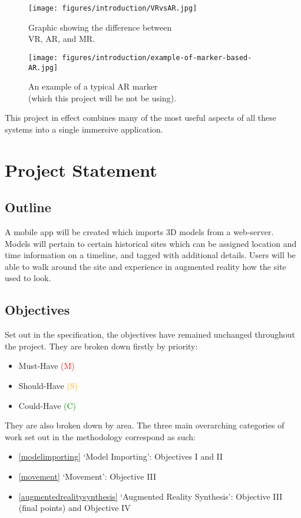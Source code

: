 \documentclass[12pt, a4paper]{article}
\newcommand{\must}[1]{\textcolor{red}{#1}}
\newcommand{\should}[1]{\textcolor{orange}{#1}}
\newcommand{\could}[1]{\textcolor{green}{#1}}
\begin{document}
\begin{figure}[H]
\centering
\begin{minipage}{.5\textwidth}
  \centering
  \texttt{[image: figures/introduction/VRvsAR.jpg]}
  \caption{Graphic showing the difference between \\ VR, AR, and MR. \cite{originality:arvrmr}}
  \label{fig:VRvsAR}
\end{minipage}%
\begin{minipage}{.5\textwidth}
  \centering
  \texttt{[image: figures/introduction/example-of-marker-based-AR.jpg]}
  \caption{An example of a typical AR marker \\ (which this project will be not be using). \cite{originality:armarker}}
  \label{fig:ARmarker}
\end{minipage}
\end{figure}

This project in effect combines many of the most useful aspects of all these systems into a single immersive application.

\newpage
\section{Project Statement}
\subsection{Outline}
A mobile app will be created which imports 3D models from a web-server. Models will pertain to certain historical sites which can be assigned location and time information on a timeline, and tagged with additional details. Users will be able to walk around the site and experience in augmented reality how the site used to look.

\subsection{Objectives}
\label{Objectives}
Set out in the specification, the objectives have remained unchanged throughout the project. They are broken down firstly by priority: 
\begin{itemize}
    \item Must-Have \must{(M)}
    \item Should-Have \should{(S)}
    \item Could-Have \could{(C)}
\end{itemize}

They are also broken down by area. The three main overarching categories of work set out in the methodology correspond as such:
\begin{itemize}
    \item \ref{modelimporting} `Model Importing': Objectives I and II 
    \item \ref{movement} `Movement': Objective III 
    \item \ref{augmentedrealitysynthesis} `Augmented Reality Synthesis': Objective III (final points) and Objective IV 
\end{itemize}
\end{document}
